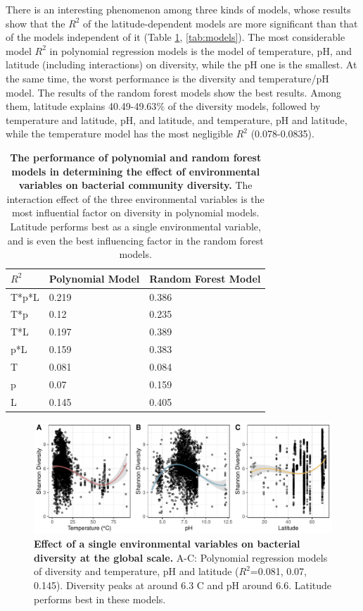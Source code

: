 \documentclass[11pt, a4paper]{article}
\begin{document}
\begin{spacing}{1.5}
There is an interesting phenomenon among three kinds of models, whose results show that the $R^{2}$ of the latitude-dependent models are more significant than that of the models independent of it (Table \ref{tab:Shan_models}, \ref{tab:models}). The most considerable model $R^{2}$ in polynomial regression models is the model of temperature, pH, and latitude (including interactions) on diversity, while the pH one is the smallest. At the same time, the worst performance is the diversity and temperature/pH model. The results of the random forest models show the best results. Among them, latitude explains 40.49-49.63$\%$ of the diversity models, followed by temperature and latitude, pH, and latitude, and temperature, pH and latitude, while the temperature model has the most negligible $R^{2}$ (0.078-0.0835). 

\begin{table}
    \caption{{\bf The performance of polynomial and random forest models in determining the effect of environmental variables on bacterial community diversity.} The interaction effect of the three environmental variables is the most influential factor on diversity in polynomial models. Latitude performs best as a single environmental variable, and is even the best influencing factor in the random forest models.} 
     \centering
    \begin{tabular}{ m{0.9cm}<{\centering}m{4cm}<{\centering}m{4cm}<{\centering}} 
    \toprule
     $R^{2}$ & Polynomial Model & Random Forest Model \\
     \midrule
    T*p*L & 0.219 & 0.386 \\
    T*p & 0.12 & 0.235 \\
    T*L & 0.197 & 0.389 \\
    p*L & 0.159 & 0.383 \\
    T & 0.081 & 0.084 \\
    p & 0.07 & 0.159 \\
    L & 0.145 & 0.405 \\
    \bottomrule
    \end{tabular}    
    \label{tab:Shan_models}
\end{table}

\begin{figure}
    \centering
    \includegraphics[scale=0.8]{./Figures/Shan_PM_simpleTpL}
    \caption{\textbf{Effect of a single environmental variables on bacterial diversity at the global scale.} A-C: Polynomial regression models of diversity and temperature, pH and latitude ($R^{2}$=0.081, 0.07, 0.145). Diversity peaks at around 6.3 \textdegree C and pH around 6.6. Latitude performs best in these models.}
    \label{fig:Shan_PM_simpleTpL}
\end{figure}


\end{spacing}
\end{document}
